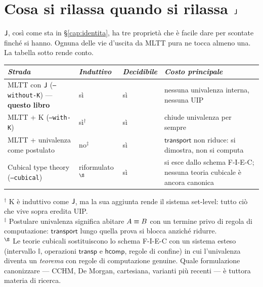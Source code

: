 \section*{Cosa si rilassa quando si rilassa $\mathsf{J}$}\label{sec:rilassare}

$\mathsf{J}$, cos\`i come sta in \S\ref{cap:identita}, ha tre propriet\`a che \`e facile dare per scontate finch\'e si hanno. Ognuna delle vie d'uscita da MLTT pura ne tocca almeno una. La tabella sotto rende conto.

\bigskip

\begin{center}
\renewcommand{\arraystretch}{1.4}
\begin{tabular}{p{4.4cm}p{2.3cm}p{2.3cm}p{4.0cm}}
\toprule
\textit{Strada} & \textit{Induttivo} & \textit{Decidibile} & \textit{Costo principale} \\
\midrule
MLTT con $\mathsf{J}$ (\texttt{--without-K}) --- \textbf{questo libro} & s\`i & s\`i & nessuna univalenza interna, nessuna UIP \\
MLTT + K (\texttt{--with-K}) & s\`i$^\dagger$ & s\`i & chiude univalenza per sempre \\
MLTT + univalenza come postulato & no$^\ddagger$ & s\`i & $\mathsf{transport}$ non riduce: si dimostra, non si computa \\
Cubical type theory (\texttt{--cubical}) & riformulato$^\S$ & s\`i & si esce dallo schema F-I-E-C; nessuna teoria cubicale \`e ancora canonica \\
\bottomrule
\end{tabular}
\end{center}

\medskip

{\small
$^\dagger$ K \`e induttivo come $\mathsf{J}$, ma la sua aggiunta rende il sistema set-level: tutto ci\`o che vive sopra eredita UIP.\\
$^\ddagger$ Postulare univalenza significa abitare $A \equiv B$ con un termine privo di regola di computazione: $\mathsf{transport}$ lungo quella prova si blocca anzich\'e ridurre.\\
$^\S$ Le teorie cubicali sostituiscono lo schema F-I-E-C con un sistema esteso (intervallo $\mathbb{I}$, operazioni $\mathsf{transp}$ e $\mathsf{hcomp}$, regole di confine) in cui l'univalenza diventa un \emph{teorema} con regole di computazione genuine. Quale formulazione canonizzare --- CCHM, De Morgan, cartesiana, varianti pi\`u recenti --- \`e tuttora materia di ricerca.}

\bigskip

